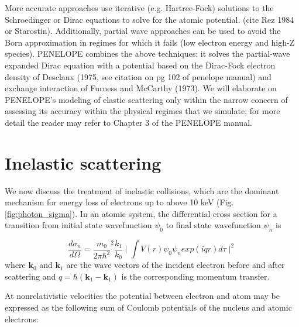 \documentclass [11pt, proquest, article] {uwthesis}[2016/11/22]
\begin{document}
More accurate approaches use iterative (e.g. Hartree-Fock) solutions to the Schroedinger or Dirac equations to solve for the atomic potential. (cite Rez 1984 or Starostin). Additionally, partial wave approaches can be used to avoid the Born approximation in regimes for which it fails (low electron energy and high-Z species). PENELOPE combines the above techniques: it solves the partial-wave expanded Dirac equation with a potential based on the Dirac-Fock electron density of Desclaux (1975, see citation on pg 102 of penelope manual) and exchange interaction of Furness and McCarthy (1973). We will elaborate on PENELOPE's modeling of elastic scattering only within the narrow concern of assessing its accuracy within the physical regimes that we simulate; for more detail the reader may refer to Chapter 3 of the PENELOPE manual. 



\section{Inelastic scattering}
We now discuss the treatment of inelastic collisions, which are the dominant mechanism for energy loss of electrons up to above 10 keV (Fig. \ref{fig:photon_sigma}).  In an atomic system, the differential cross section for a transition from initial state wavefunction $\psi_0$ to final state wavefunction $\psi_n$ is

\begin{equation} \label{bornDCS}
\frac{d\sigma_n}{d\Omega} = \frac{m_0}{2\pi \hbar^2}^2 \frac{k_1}{k_0} \mid \int V(r) \psi_0 \psi_n exp(i q r) d\tau \mid ^2
\end{equation}
where $\textbf{k}_0$ and $\textbf{k}_1$ are the wave vectors of the incident electron before and after scattering and $q = \hbar (\textbf{k}_1 - \textbf{k}_1)$ is the corresponding momentum transfer. 

At nonrelativistic velocities the potential between electron and atom may be expressed as the following sum of Coulomb potentials of the nucleus and atomic electrons:
\end{document}
